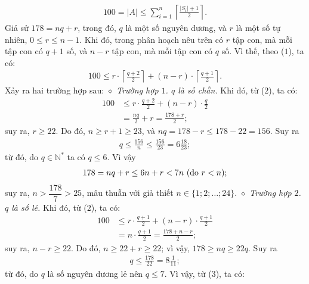 \begin{multicols}{2}
	\begin{align*}
		100 = |A| \le \sum\limits_{i = 1}^n {\left\lceil {\frac{{\left| {{S_i}} \right| + 1}}{2}} \right\rceil}. \tag{$1$}
	\end{align*}
	Giả sử $178 = nq + r$, trong đó, $q$ là một số nguyên dương, và $r$ là một số tự nhiên, \linebreak$0 \le r \le n - 1$. Khi đó, trong phân hoạch nêu trên có $r$ tập con, mà mỗi tập con có $q + 1$ số, và $n - r$ tập con, mà mỗi tập con có $q$ số. Vì thế, theo ($1$), ta có:
	\begin{align*}
		100 \!\le\! r \!\cdot\! \left\lceil {\frac{{q \!+\! 2}}{2}} \right\rceil \!+\! \left( {n \!-\! r} \right) \!\cdot\!\left\lceil {\frac{{q \!+\! 1}}{2}}\right\rceil\!. \tag{$2$}
	\end{align*}
	Xảy ra hai trường hợp sau:
	\vskip 0.05cm
	$\diamond$ \textit{Trường hợp $1$. $q$ là số chẵn.}
	\vskip 0.05cm
	Khi đó, từ ($2$), ta có:
	\begin{align*}
		100 &\le r \cdot \frac{{q + 2}}{2} + \left( {n - r} \right) \cdot \frac{q}{2}\\
		 &= \frac{{nq}}{2} + r = \frac{{178 + r}}{2};
	\end{align*}
	suy ra, $r \ge 22$. Do đó, $n \ge r + 1 \ge 23$, và $nq = 178 - r \le 178 - 22 = 156$. Suy ra
	\begin{align*}
		q \le \frac{{156}}{n} \le \frac{{156}}{{23}} = 6\frac{{18}}{{23}};
	\end{align*}
	từ đó, do $q \in \mathbb{N^*}$  ta có $q \le 6$. Vì vậy
	\begin{align*}
		178 = nq + r \le 6n + r < 7n   \,\,(\text{\color{black}do }r < n);
	\end{align*}
	suy ra, $n > \dfrac{178}{7} > 25$,  mâu thuẫn với giả thiết $n \in \{1; 2; \ldots; 24\}$.
	\vskip 0.05cm
	$\diamond$ \textit{Trường hợp $2$. $q$ là số lẻ.}
	\vskip 0.05cm
	Khi đó, từ ($2$), ta có:
	\begin{align*}
		100 &\le r \cdot \frac{{q + 1}}{2} + \left( {n - r} \right) \cdot \frac{{q + 1}}{2} \\
		&= n \cdot \frac{{q + 1}}{2} = \frac{{178 + n - r}}{2}; \tag{$3$}
	\end{align*}
	suy ra, $n - r \ge 22$. Do đó, $n \ge 22 + r \ge 22$; vì vậy, $178 \ge nq \ge 22q$. Suy ra
	\begin{align*}
		q \le \frac{{178}}{{22}} = 8\frac{1}{{11}};
	\end{align*}
	từ đó, do $q$ là số nguyên dương lẻ nên $q \le 7$. Vì vậy, từ ($3$), ta có:
	\begin{align*}

\end{align*}
\end{multicols}
